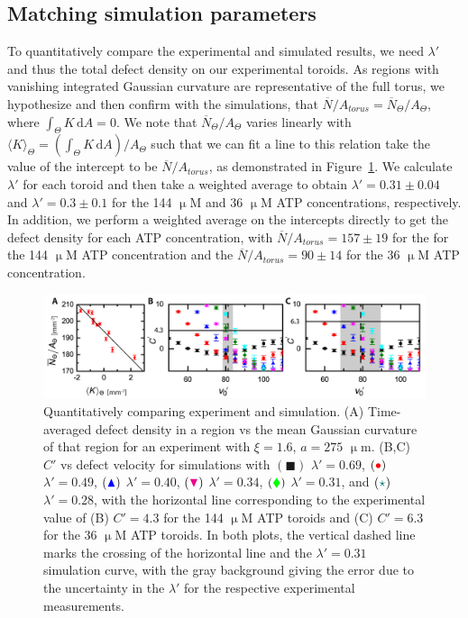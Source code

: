\subsection{Matching simulation parameters}
To quantitatively compare the experimental and simulated results, we need $\lambda'$ and thus the total defect density on our experimental toroids.
As regions with vanishing integrated Gaussian curvature are representative of the full torus, we hypothesize and then confirm with the simulations, that $\overbar{N}/A_{torus} = \overbar{N}_{\Theta}/A_{\Theta}$, where  $\int_{\Theta} K\, \textrm{d}A = 0$.
We note that $\overbar{N}_{\Theta}/A_{\Theta}$ varies linearly with $\langle K \rangle_{\Theta} = (\int_{\Theta}K\,\textrm{d}A)/A_{\Theta}$ such that we can fit a line to this relation take the value of the intercept to be $\overbar{N}/A_{torus}$, as demonstrated in Figure~\ref{f:3-MatchParam}.
We calculate $\lambda'$ for each toroid and then take a weighted average to obtain $\lambda' = 0.31 \pm 0.04$ and $\lambda' = 0.3 \pm 0.1$ for the 144 $\upmu$M and 36 $\upmu$M ATP concentrations, respectively.
In addition, we perform a weighted average on the intercepts directly to get the defect density for each ATP concentration, with $\overbar{N}/A_{torus} = 157 \pm 19$ for the for the 144 $\upmu$M ATP concentration and the $\overbar{N}/A_{torus} = 90 \pm 14$ for the 36 $\upmu$M ATP concentration.
\begin{figure}
  \centering
  \includegraphics{figures/C3/Ch3-Figs_MatchParam.png}
  \caption{Quantitatively comparing experiment and simulation.
  (A) Time-averaged defect density in a region vs the mean Gaussian curvature of that region for an experiment with $\xi = 1.6$, $a = 275$ $\upmu$m.
  (B,C) $C'$ vs defect velocity for simulations with
  $({\blacksquare})$ $\lambda' = 0.69$,
  $({\color{red} \bullet})$ $\lambda' = 0.49$,
  $({\color{blue} \blacktriangle})$ $\lambda' = 0.40$,
  $({\color{magenta} \blacktriangledown})$ $\lambda' = 0.34$,
  $({\color{green} \blacklozenge})$ $\lambda' = 0.31$, and
  $({\color{teal} \star})$ $\lambda' = 0.28$,
  with the horizontal line corresponding to the experimental value of (B) $C' = 4.3$ for the 144 $\upmu$M ATP toroids and (C) $C' = 6.3$ for the 36 $\upmu$M ATP toroids.
  In both plots, the vertical dashed line marks the crossing of the horizontal line and the $\lambda' = 0.31$ simulation curve, with the gray background giving the error due to the uncertainty in the $\lambda'$ for the respective experimental measurements.}\label{f:3-MatchParam}
\end{figure}

